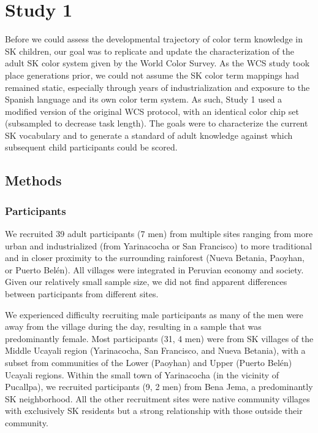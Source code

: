 \documentclass[
  ,apa7,floatsintext]{apa6}
\begin{document}
\hypertarget{study-1}{%
\section{Study 1}\label{study-1}}

Before we could assess the developmental trajectory of color term knowledge in SK children, our goal was to replicate and update the characterization of the adult SK color system given by the World Color Survey. As the WCS study took place generations prior, we could not assume the SK color term mappings had remained static, especially through years of industrialization and exposure to the Spanish language and its own color term system. As such, Study 1 used a modified version of the original WCS protocol, with an identical color chip set (subsampled to decrease task length). The goals were to characterize the current SK vocabulary and to generate a standard of adult knowledge against which subsequent child participants could be scored.

\hypertarget{methods}{%
\subsection{Methods}\label{methods}}

\hypertarget{participants}{%
\subsubsection{Participants}\label{participants}}

We recruited 39 adult participants (7 men) from multiple sites ranging from more urban and industrialized (from Yarinacocha or San Francisco) to more traditional and in closer proximity to the surrounding rainforest (Nueva Betania, Paoyhan, or Puerto Belén). All villages were integrated in Peruvian economy and society. Given our relatively small sample size, we did not find apparent differences between participants from different sites.

We experienced difficulty recruiting male participants as many of the men were away from the village during the day, resulting in a sample that was predominantly female. Most participants (31, 4 men) were from SK villages of the Middle Ucayali region (Yarinacocha, San Francisco, and Nueva Betania), with a subset from communities of the Lower (Paoyhan) and Upper (Puerto Belén) Ucayali regions. Within the small town of Yarinacocha (in the vicinity of Pucallpa), we recruited participants (9, 2 men) from Bena Jema, a predominantly SK neighborhood. All the other recruitment sites were native community villages with exclusively SK residents but a strong relationship with those outside their community.
\end{document}
